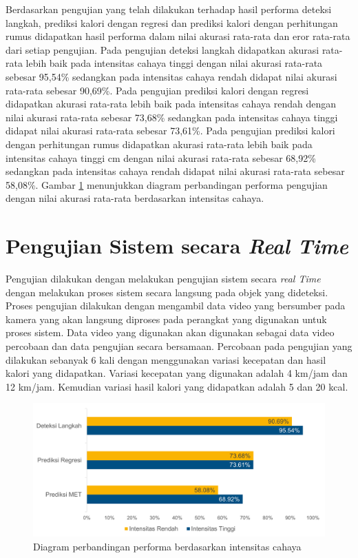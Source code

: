 Berdasarkan pengujian yang telah dilakukan terhadap hasil performa deteksi langkah, prediksi kalori dengan regresi dan prediksi kalori dengan perhitungan rumus didapatkan hasil performa dalam nilai akurasi rata-rata dan eror rata-rata dari setiap pengujian. Pada pengujian deteksi langkah didapatkan akurasi rata-rata lebih baik pada intensitas cahaya tinggi dengan nilai akurasi rata-rata sebesar 95,54\% sedangkan pada intensitas cahaya rendah didapat nilai akurasi rata-rata sebesar 90,69\%. Pada pengujian prediksi kalori dengan regresi didapatkan akurasi rata-rata lebih baik pada intensitas cahaya rendah dengan nilai akurasi rata-rata sebesar 73,68\% sedangkan pada intensitas cahaya tinggi didapat nilai akurasi rata-rata sebesar 73,61\%. Pada pengujian prediksi kalori dengan perhitungan rumus didapatkan akurasi rata-rata lebih baik pada intensitas cahaya tinggi cm dengan nilai akurasi rata-rata sebesar 68,92\% sedangkan pada intensitas cahaya rendah didapat nilai akurasi rata-rata sebesar 58,08\%. Gambar \ref{fig:DiagramPosisi} menunjukkan diagram perbandingan performa pengujian dengan nilai akurasi rata-rata berdasarkan intensitas cahaya.



\section{Pengujian Sistem secara \emph{Real Time}}
\label{sec:PengujianRealTime}

Pengujian dilakukan dengan melakukan pengujian sistem secara \emph{real Time} dengan melakukan proses sistem secara langsung pada objek yang dideteksi. Proses pengujian dilakukan dengan mengambil data video yang bersumber pada kamera yang akan langsung diproses pada perangkat yang digunakan untuk proses sistem. Data video yang digunakan akan digunakan sebagai data video percobaan dan data pengujian secara bersamaan. Percobaan pada pengujian yang dilakukan sebanyak 6 kali dengan menggunakan variasi kecepatan dan hasil kalori yang didapatkan. Variasi kecepatan yang digunakan adalah 4 km/jam dan 12 km/jam. Kemudian variasi hasil kalori yang didapatkan adalah 5 dan 20 kcal.

\begin{figure}[H]
  \centering
  \includegraphics[scale=0.7]{gambar/diagram_cahaya.png}
  \caption{Diagram perbandingan performa berdasarkan intensitas cahaya}
  \label{fig:DiagramPosisi}
\end{figure}

